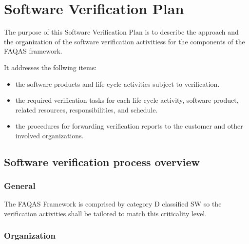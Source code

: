 \chapter{Software Verification Plan}
The purpose of this Software Verification Plan is to describe the approach and the organization of the software verification activitiess for the components of the FAQAS framework.

It addresses the follwing items:
\begin{itemize}
  \item the software products and life cycle activities
  subject to verification.
  \item the required verification tasks for each life cycle activity, software product, related resources, responsibilities, and schedule.
  \item the procedures for forwarding verification reports to the customer and other involved organizations.
\end{itemize}

\section{Software verification process overview}

\subsection{General}

The FAQAS Framework is comprised by category D classified SW so the verification activities shall be tailored to match this criticality level.


\subsection{Organization}

